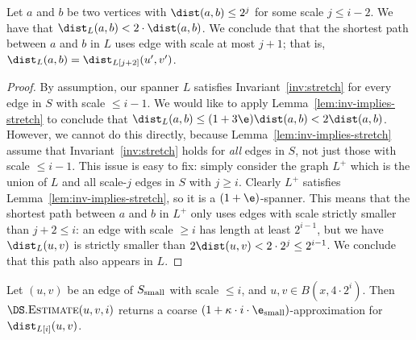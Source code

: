 %
\begin{observation}
\label{obs:small-L}
    Let $a$ and $b$ be two vertices with $\dist(a,b) \le 2^j$ for some scale $j \le i - 2$. 
    We have that $\dist_L(a,b) < 2 \cdot \dist(a,b)$. We conclude that that the shortest path between $a$ and $b$ in $L$ uses edge with scale at most $j+1$; that is, $\dist_{L}(a,b) = \dist_{L[j+2]}(u',v')$.
\end{observation}
\begin{proof}
    By assumption, our spanner $L$ satisfies Invariant~\ref{inv:stretch} for every edge in $S$ with scale $\le i - 1$. We would like to apply Lemma~\ref{lem:inv-implies-stretch} to conclude that $\dist_L(a,b) \le (1+3\e) \dist(a,b) < 2 \dist(a,b)$. However, we cannot do this directly, because Lemma~\ref{lem:inv-implies-stretch} assume that Invariant~\ref{inv:stretch} holds for \emph{all} edges in $S$, not just those with scale $\le i -1$. This issue is easy to fix: simply consider the graph $L^+$ which is the union of $L$ and all scale-$j$ edges in $S$ with $j \ge i$. Clearly $L^+$ satisfies Lemma~\ref{lem:inv-implies-stretch}, so it is a $(1+\e)$-spanner. This means that the shortest path between $a$ and $b$ in $L^+$ only uses edges with scale strictly smaller than $j + 2 \le i$: an edge with scale $\ge i$ has length at least $2^{i-1}$, but we have $\dist_L(u,v)$ is strictly smaller than $2 \dist(u,v) < 2 \cdot 2^{j} \le 2^{i-1}$. We conclude that this path also appears in $L$.
\end{proof}
%
%
\begin{lemma}
\label{lem:estimate-correct}
Let $(u,v)$ be an edge of $S_{\rm small}$ with scale $\le i$, and $u,v \in B(x, 4 \cdot 2^i)$. Then $\DS.\textsc{Estimate}(u,v,i)$ returns a coarse $(1 + \kappa \cdot i \cdot \e_{\rm small})$-approximation for $\dist_{L[i]}(u,v)$.
\end{lemma}
